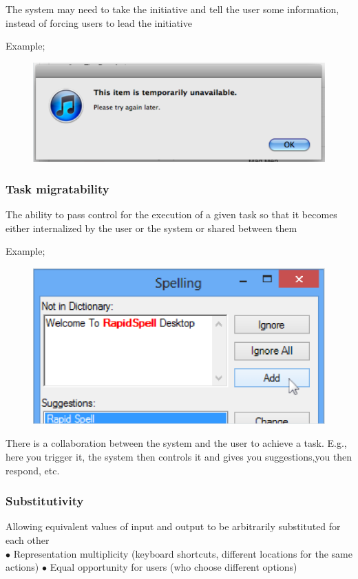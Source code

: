 \documentclass[]{project_plan}
\newcommand{\bulletPoint}{\hspace{-3.1pt}$\bullet$ \hspace{5pt}}
\begin{document}
The system may need to take the initiative and tell the user some information,
instead of forcing users to lead the initiative

Example;
\begin{figure}[h!]
  \centering
  \includegraphics[width=\linewidth]{dialog_initiative_example.png}
\end{figure}

\newpage

\subsubsection{Task migratability}
The ability to pass control for the execution of a given task so that it becomes
either internalized by the user or the system or shared between them

Example;
\begin{figure}[h!]
  \centering
  \includegraphics[width=\linewidth]{task_migratability_example.png}
\end{figure}

There is a collaboration between the system and the user to achieve a task. E.g.,
here you trigger it, the system then controls it and gives you suggestions,you
then respond, etc.

\subsubsection{Substitutivity}
Allowing equivalent values of input and output to be arbitrarily substituted
for each other\\
\bulletPoint Representation multiplicity (keyboard shortcuts, different locations
for the same actions)
\bulletPoint Equal opportunity for users (who choose different options)
\end{document}
